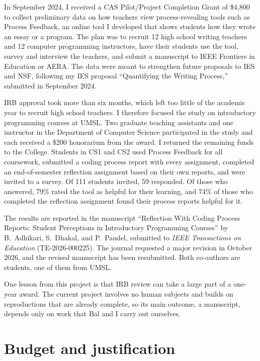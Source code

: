 \documentclass[11pt]{article}
\begin{document}
In September 2024, I received a CAS Pilot/Project Completion Grant of \$4,800 to collect preliminary data on how teachers view process-revealing tools such as Process Feedback, an online tool I developed that shows students how they wrote an essay or a program. The plan was to recruit 12 high school writing teachers and 12 computer programming instructors, have their students use the tool, survey and interview the teachers, and submit a manuscript to IEEE Frontiers in Education or AERA. The data were meant to strengthen future proposals to IES and NSF, following my IES proposal ``Quantifying the Writing Process,'' submitted in September 2024.

IRB approval took more than six months, which left too little of the academic year to recruit high school teachers. I therefore focused the study on introductory programming courses at UMSL. Two graduate teaching assistants and one instructor in the Department of Computer Science participated in the study and each received a \$200 honorarium from the award. I returned the remaining funds to the College. Students in CS1 and CS2 used Process Feedback for all coursework, submitted a coding process report with every assignment, completed an end-of-semester reflection assignment based on their own reports, and were invited to a survey. Of 111 students invited, 59 responded. Of those who answered, 79\% rated the tool as helpful for their learning, and 74\% of those who completed the reflection assignment found their process reports helpful for it.

The results are reported in the manuscript ``Reflection With Coding Process Reports: Student Perceptions in Introductory Programming Courses'' by B.~Adhikari, S.~Dhakal, and P.~Paudel, submitted to \emph{IEEE Transactions on Education} (TE-2026-000225). The journal requested a major revision in October 2026, and the revised manuscript has been resubmitted. Both co-authors are students, one of them from UMSL.

One lesson from this project is that IRB review can take a large part of a one-year award. The current project involves no human subjects and builds on reproductions that are already complete, so its main outcome, a manuscript, depends only on work that Bal and I carry out ourselves.

\clearpage
\section*{Budget and justification}
\end{document}
